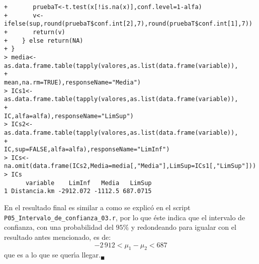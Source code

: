 \begin{solucion}
\begin{verbatim}
+       pruebaT<-t.test(x[!is.na(x)],conf.level=1-alfa)
+       v<-ifelse(sup,round(pruebaT$conf.int[2],7),round(pruebaT$conf.int[1],7))
+       return(v)
+    } else return(NA)
+ }
> media<-as.data.frame.table(tapply(valores,as.list(data.frame(variable)),
+                                   mean,na.rm=TRUE),responseName="Media")
> ICs1<-as.data.frame.table(tapply(valores,as.list(data.frame(variable)),
+                                  IC,alfa=alfa),responseName="LimSup")
> ICs2<-as.data.frame.table(tapply(valores,as.list(data.frame(variable)),
+                                  IC,sup=FALSE,alfa=alfa),responseName="LimInf")
> ICs<-na.omit(data.frame(ICs2,Media=media[,"Media"],LimSup=ICs1[,"LimSup"]))
> ICs
      variable    LimInf   Media   LimSup
1 Distancia.km -2912.072 -1112.5 687.0715
 \end{verbatim}
 \vspace{-0.5cm}
 En el resultado final es similar a como se explic\'o en el script \texttt{P05\_Intervalo\_de\_confianza\_03.r}, por lo que \'este indica que el intervalo de confianza, con una probabilidad del $95\%$ y redondeando para igualar con el resultado antes mencionado, es de:
 \begin{equation*}
  -2\,912 < \mu_1 - \mu_2 < 687
 \end{equation*}
 que es a lo que se quer\'{\i}a llegar.${}_{\blacksquare}$
\end{solucion}
